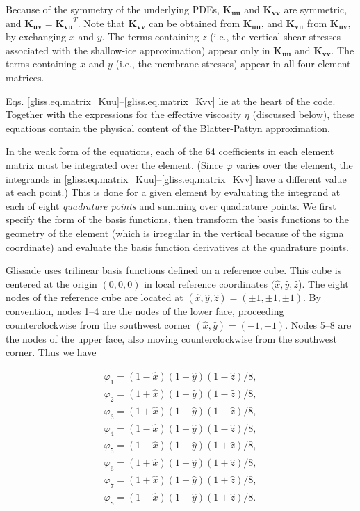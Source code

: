 Because of the symmetry of the underlying PDEs, $\mathbf{K_{uu}}$ and $\mathbf{K_{vv}}$ are symmetric,
and $\mathbf{K_{uv}} = \mathbf{K_{vu}}^{T}$.  Note that $\mathbf{K_{vv}}$ can be obtained from $\mathbf{K_{uu}}$, 
and $\mathbf{K_{vu}}$ from $\mathbf{K_{uv}}$, by exchanging $x$ and $y$.  The terms
containing $z$ (i.e., the vertical shear stresses associated with the shallow-ice approximation)
appear only in $\mathbf{K_{uu}}$ and $\mathbf{K_{vv}}$.  The terms containing $x$ and $y$ (i.e.,
the membrane stresses) appear in all four element matrices.

Eqs. \eqref{gliss.eq.matrix_Kuu}--\eqref{gliss.eq.matrix_Kvv} lie at the heart of the code. 
Together with the expressions for the effective viscosity $\eta$ (discussed below),
these equations contain the physical content of the Blatter-Pattyn approximation. 

In the weak form of the equations, each of the 64 coefficients in each
element matrix must be integrated over the element.  (Since $\varphi$ varies over the element,
the integrands in \eqref{gliss.eq.matrix_Kuu}--\eqref{gliss.eq.matrix_Kvv} 
have a different value at each point.)  
This is done for a given element by evaluating the integrand at each of 
eight \textit{quadrature points} and summing over quadrature points.
We first specify the form of the basis functions, then transform the basis functions to
the geometry of the element (which is irregular in the vertical because of the sigma
coordinate) and evaluate the basis function derivatives at the quadrature points.

Glissade uses trilinear basis functions defined on a reference cube.  
This cube is centered at the origin $(0,0,0)$ in local reference coordinates 
$(\hat{x}, \hat{y}, \hat{z}$). 
The eight nodes of the reference cube are located at $(\hat{x}, \hat{y}, \hat{z}) = (\pm 1, \pm 1, \pm 1)$.
By convention, nodes 1--4 are the nodes of the lower face, proceeding counterclockwise
from the southwest corner $(\hat{x}, \hat{y}) = (-1, -1)$. Nodes 5--8 are the nodes
of the upper face, also moving counterclockwise from the southwest corner.
Thus we have

\begin{equation}
  \label{gliss.eq.basis_functions}
  \begin{matrix}
    {{\varphi }_{1}}=(1-\hat{x})(1-\hat{y})(1-\hat{z})/8,  \\[3pt]
    {{\varphi }_{2}}=(1+\hat{x})(1-\hat{y})(1-\hat{z})/8,  \\[3pt]
    {{\varphi }_{3}}=(1+\hat{x})(1+\hat{y})(1-\hat{z})/8,  \\[3pt]
    {{\varphi }_{4}}=(1-\hat{x})(1+\hat{y})(1-\hat{z})/8,  \\[3pt]
    {{\varphi }_{5}}=(1-\hat{x})(1-\hat{y})(1+\hat{z})/8,  \\[3pt]
    {{\varphi }_{6}}=(1+\hat{x})(1-\hat{y})(1+\hat{z})/8,  \\[3pt]
    {{\varphi }_{7}}=(1+\hat{x})(1+\hat{y})(1+\hat{z})/8,  \\[3pt]
    {{\varphi }_{8}}=(1-\hat{x})(1+\hat{y})(1+\hat{z})/8.  \\
  \end{matrix}
\end{equation} 

